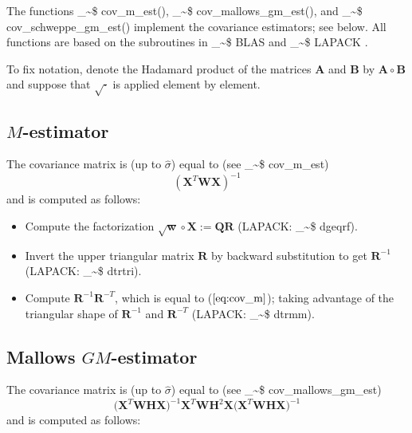 \documentclass[a4paper,oneside,11pt,DIV=12]{scrartcl}
\makeatletter
\theoremstyle{remark}
\newcommand\code{\bgroup\@makeother\_\@makeother\~\@makeother\$\@makeother\^\@codex}
\def\@codex#1{{\normalfont\ttfamily\hyphenchar\font=-1 #1}\egroup}
\makeatother
\begin{document}
\noindent The functions \code{cov_m_est()}, \code{cov_mallows_gm_est()}, and
\code{cov_schweppe_gm_est()} implement the covariance estimators; see below.
All functions are based on the subroutines in \code{BLAS}
\citep{blackford_petitet_etal_2002} and \code{LAPACK}
\citep{anderson_bai_etal_1999}.

To fix notation, denote the Hadamard product of the matrices $\bm A$ and $\bm
B$ by $\bm A\circ \bm B$ and suppose that $\sqrt{\cdot}$ is applied element by
element.

\subsection{$M$-estimator}
The covariance matrix is (up to $\widehat{\sigma}$) equal to (see
\code{cov_m_est})
\begin{equation}\label{eq:cov_m}
   (\bm X^T \bm W \bm X)^{-1}
\end{equation}
\noindent and is computed as follows:
\begin{itemize}
    \item Compute the factorization $\sqrt{\bm w} \circ \bm X := \bm Q \bm R$
        (LAPACK: \code{dgeqrf}).
    \item Invert the upper triangular matrix $\bm R$ by backward substitution
        to get $\bm R^{-1}$ (LAPACK: \code{dtrtri}).
    \item Compute $\bm R^{-1} \bm R^{-T}$, which is equal to
        ($\ref{eq:cov_m}$); taking advantage of the triangular shape of $\bm
        R^{-1}$ and $\bm R^{-T}$ (LAPACK: \code{dtrmm}).
\end{itemize}

\subsection{Mallows $GM$-estimator}
The covariance matrix is (up to $\widehat{\sigma}$) equal to (see
\code{cov_mallows_gm_est})
\begin{equation}\label{eq:cov_mallows}
   \big(\bm X^T \bm W \bm H \bm X\big)^{-1} \bm X^T \bm W \bm H^2 \bm X
    \big(\bm X^T \bm W \bm H \bm X\big)^{-1}
\end{equation}
\noindent and is computed as follows:
\end{document}
